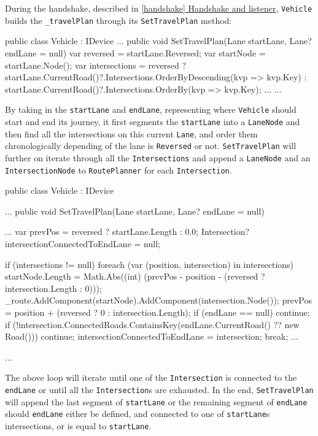 During the handshake, described in \hyperref[handshake]{\ref{handshake} Handshake and listener}, \verb|Vehicle| builds the \verb|_travelPlan| through its \verb|SetTravelPlan| method:
\begin{csharp}
public class Vehicle : IDevice
{
	...
	public void SetTravelPlan(Lane startLane, Lane? endLane = null)
	{
		var reversed = startLane.Reversed;
		var startNode = startLane.Node();
		var intersections = 
			reversed ? 
				startLane.CurrentRoad()?.Intersections.OrderByDescending(kvp => kvp.Key) : 
				startLane.CurrentRoad()?.Intersections.OrderBy(kvp => kvp.Key);
		...
	}
	...
}
\end{csharp}
By taking in the \verb*|startLane| and \verb*|endLane|, representing where \verb*|Vehicle| should start and end its journey, it first segments the \verb*|startLane| into a \verb*|LaneNode| and then find all the intersections on this current \verb*|Lane|, and order them chronologically depending of the lane is \verb*|Reversed| or not. \verb|SetTravelPlan| will further on iterate through all the \verb*|Intersections| and append a \verb|LaneNode| and an \verb|IntersectionNode| to \verb|RoutePlanner| for each \verb*|Intersection|.
\begin{csharp}
public class Vehicle : IDevice
{
	...
	public void SetTravelPlan(Lane startLane, Lane? endLane = null)
	{
		...
		var prevPos = reversed ? startLane.Length : 0.0;
		Intersection? intersectionConnectedToEndLane = null;
		
		if (intersections != null)
			foreach (var (position, intersection) in intersections)
			{
				startNode.Length = Math.Abs((int) (prevPos - position - (reversed ? intersection.Length : 0)));
				_route.AddComponent(startNode).AddComponent(intersection.Node());
				prevPos = position + (reversed ? 0 : intersection.Length);
				if (endLane == null) continue;
				if (!intersection.ConnectedRoads.ContainsKey(endLane.CurrentRoad() ?? new Road())) continue;
				intersectionConnectedToEndLane = intersection;
				break;
			}
		...
	}
	...
}
\end{csharp}
The above loop will iterate until one of the \verb*|Intersection| is connected to the \verb*|endLane| or until all the \verb*|Intersection|s are exhausted. In the end, \verb*|SetTravelPlan| will append the last segment of \verb*|startLane| or the remaining segment of \verb*|endLane| should \verb*|endLane| either be defined, and connected to one of \verb*|startLane|s intersections, or is equal to \verb*|startLane|.

